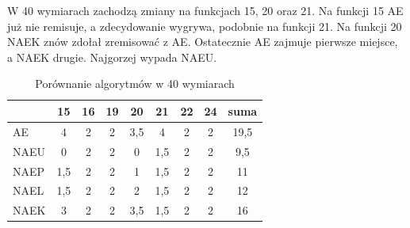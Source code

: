 \documentclass[12pt, a4paper]{article}
\begin{document}
W 40 wymiarach zachodzą zmiany na funkcjach 15, 20 oraz 21. Na funkcji 15 AE już nie remisuje,
a zdecydowanie wygrywa, podobnie na funkcji 21. Na funkcji 20 NAEK znów zdołał zremisować z AE.
Ostatecznie AE zajmuje pierwsze miejsce, a NAEK drugie. Najgorzej wypada NAEU.

\begin{table}[H]
\centering
\begin{tabular}{ l | c | c | c | c | c | c | c | c}
         & 15  & 16 & 19 & 20  & 21  & 22 & 24 & suma \\ \hline
AE       & 4   & 2  & 2  & 3,5 & 4   & 2  & 2  & 19,5 \\ 
NAEU     & 0   & 2  & 2  & 0   & 1,5 & 2  & 2  & 9,5  \\ 
NAEP     & 1,5 & 2  & 2  & 1   & 1,5 & 2  & 2  & 11   \\ 
NAEL     & 1,5 & 2  & 2  & 2   & 1,5 & 2  & 2  & 12   \\
NAEK     & 3   & 2  & 2  & 3,5 & 1,5 & 2  & 2  & 16   \\ 
\end{tabular}
\caption{Porównanie algorytmów w 40 wymiarach}
\label{table:total}
\end{table}
\end{document}
